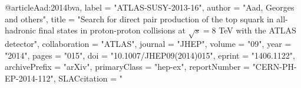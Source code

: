 @article{Aad:2014bva,
      label          = "ATLAS-SUSY-2013-16",
      author         = "Aad, Georges and others",
      title          = "{Search for direct pair production of the top squark in
                        all-hadronic final states in proton-proton collisions at
                        $\sqrt{s}=8$ TeV with the ATLAS detector}",
      collaboration  = "ATLAS",
      journal        = "JHEP",
      volume         = "09",
      year           = "2014",
      pages          = "015",
      doi            = "10.1007/JHEP09(2014)015",
      eprint         = "1406.1122",
      archivePrefix  = "arXiv",
      primaryClass   = "hep-ex",
      reportNumber   = "CERN-PH-EP-2014-112",
      SLACcitation   = "%
}

